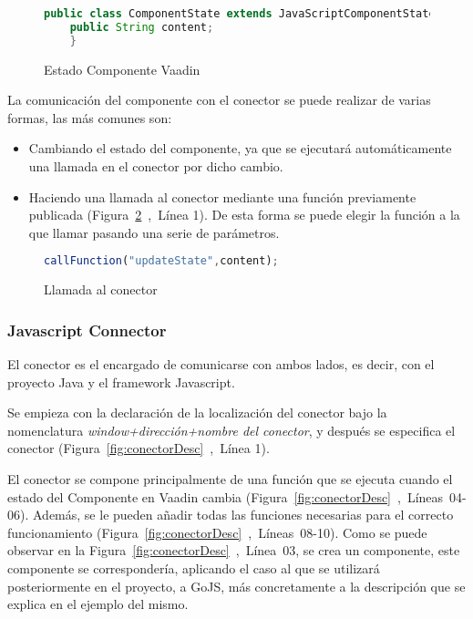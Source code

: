 \begin{figure}[!tb]
	\centering
	\begin{lstlisting}[language=Java]
	public class ComponentState extends JavaScriptComponentState {
	public String content;
	}
	\end{lstlisting}
	\caption{Estado Componente Vaadin}
	\label{fig:estadoComponenteVaadin}
\end{figure}


La comunicación del componente con el conector se puede realizar de varias formas, las más comunes son:
\begin{itemize}
	\item  Cambiando el estado del componente, ya que se ejecutará automáticamente una llamada en el conector por dicho cambio.
	\item  Haciendo una llamada al conector mediante una función previamente publicada (Figura~\ref{fig:callfunction}~,~Línea 1). De esta forma se puede elegir la función a la que llamar pasando una serie de parámetros.
\end{itemize}

\begin{figure}[!tb]
	\centering
	\begin{lstlisting}[language=JavaScript]
	callFunction("updateState",content);
	\end{lstlisting}
	\caption{Llamada al conector}
	\label{fig:callfunction}
\end{figure}



\subsubsection{Javascript Connector}	


El conector es el encargado de comunicarse con ambos lados, es decir, con el proyecto Java y el framework Javascript.

Se empieza con la declaración de la localización del conector bajo la nomenclatura \emph{window+dirección+nombre del conector}, y después se especifica el conector (Figura~\ref{fig:conectorDesc}~,~Línea 1).

El conector se compone principalmente de una función que se ejecuta cuando el estado del Componente en Vaadin cambia (Figura~\ref{fig:conectorDesc}~,~Líneas~04-06). Además, se le pueden añadir todas las funciones necesarias para el correcto funcionamiento (Figura~\ref{fig:conectorDesc}~,~Líneas~08-10). Como se puede observar en la Figura~\ref{fig:conectorDesc}~,~Línea~03, se crea un componente, este componente se correspondería, aplicando el caso al que se utilizará posteriormente en el proyecto, a GoJS, más concretamente a la descripción que se explica en el ejemplo del mismo.


